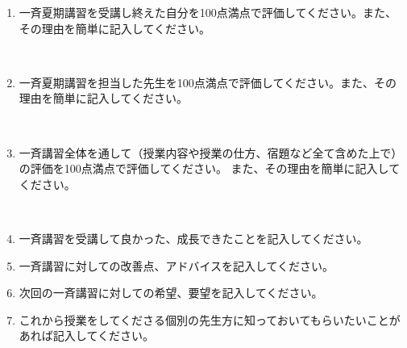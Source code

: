   \vspace{1em}
  \begin{enumerate}
    \item 一斉夏期講習を受講し終えた自分を100点満点で評価してください。また、その理由を簡単に記入してください。
      \begin{center}
      \scorebox\\[1.5em]
      \sheetline[0.95\linewidth][4em]
      \end{center}

    \item 一斉夏期講習を担当した先生を100点満点で評価してください。また、その理由を簡単に記入してください。
      \begin{center}
      \scorebox\\[1.5em]
      \sheetline[0.95\linewidth][4em]
      \end{center}

    \item 一斉講習全体を通して（授業内容や授業の仕方、宿題など全て含めた上で）の評価を100点満点で評価してください。
    また、その理由を簡単に記入してください。
      \begin{center}
      \scorebox\\[1.5em]
      \sheetline[0.95\linewidth][4em]
      \end{center}

    \item 一斉講習を受講して良かった、成長できたことを記入してください。
      \begin{center}
      \sheetline[0.95\linewidth][8em]
      \end{center}

    \item 一斉講習に対しての改善点、アドバイスを記入してください。
      \begin{center}
      \sheetline[0.95\linewidth][3em]
      \end{center}

      \newpage

    \item 次回の一斉講習に対しての希望、要望を記入してください。
      \begin{center}
      \sheetline[0.95\linewidth][3em]
      \end{center}

    \item これから授業をしてくださる個別の先生方に知っておいてもらいたいことがあれば記入してください。
      \begin{center}
      \sheetline[0.95\linewidth][3em]
      \end{center}


\end{enumerate}
